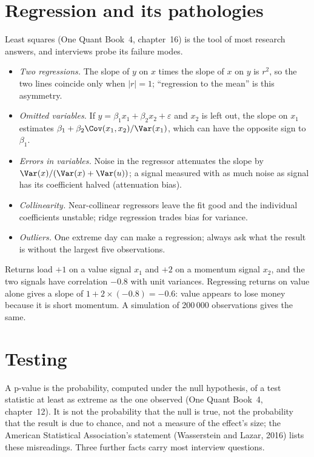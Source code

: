 \section{Regression and its pathologies}

Least squares (One Quant Book~4, chapter~16) is the tool of most research answers, and interviews probe its failure
modes.

\begin{itemize}
\item \emph{Two regressions.} The slope of $y$ on $x$ times the slope of $x$ on $y$ is $r^2$, so the two lines
coincide only when $|r| = 1$; ``regression to the mean'' is this asymmetry.
\item \emph{Omitted variables.} If $y = \beta_1 x_1 + \beta_2 x_2 + \varepsilon$ and $x_2$ is left out, the slope
on $x_1$ estimates $\beta_1 + \beta_2 \Cov(x_1, x_2)/\Var(x_1)$, which can have the opposite sign to $\beta_1$.
\item \emph{Errors in variables.} Noise in the regressor attenuates the slope by $\Var(x)/(\Var(x) + \Var(u))$; a
signal measured with as much noise as signal has its coefficient halved (attenuation bias).
\item \emph{Collinearity.} Near-collinear regressors leave the fit good and the individual coefficients unstable;
ridge regression trades bias for variance.
\item \emph{Outliers.} One extreme day can make a regression; always ask what the result is without the largest
five observations.
\end{itemize}

\begin{example}\label{ex:iv:statistics:omitted}
Returns load $+1$ on a value signal $x_1$ and $+2$ on a momentum signal $x_2$, and the two signals have correlation
$-0.8$ with unit variances. Regressing returns on value alone gives a slope of $1 + 2 \times (-0.8) = -0.6$: value
appears to lose money because it is short momentum. A simulation of 200\,000 observations gives the same.
\end{example}

\section{Testing}

A p-value is the probability, computed under the null hypothesis, of a test statistic at least as extreme as the one
observed (One Quant Book~4, chapter~12). It is not the probability that the null is true, not the probability that the
result is due to chance, and not a measure of the effect's size; the American Statistical Association's statement
(Wasserstein and Lazar, 2016) lists these misreadings. Three further facts carry most interview questions.

